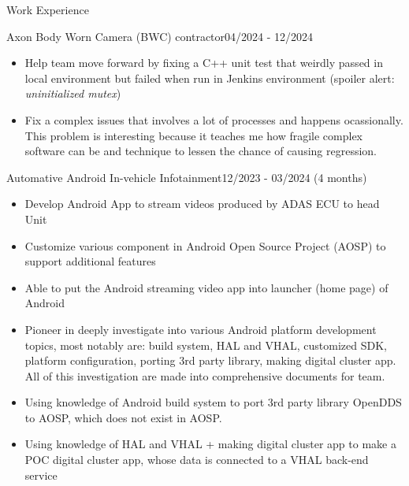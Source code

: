 \documentclass{resume} %
\begin{document}
\begin{rSection}{Work Experience}
\begin{rCompanySubsection}
\begin{rProjectSubsubsectionV2}{Axon Body Worn Camera (BWC) contractor}{04/2024 - 12/2024}
{\begin{itemize}
                \item Help team move forward by fixing a C++ unit test that weirdly passed in local environment but failed when run in Jenkins environment (spoiler alert: \textit{uninitialized mutex})
                \item Fix a complex issues that involves a lot of processes and happens ocassionally. This problem is interesting because it teaches me how fragile complex software can be and technique to lessen the chance of causing regression.
            \end{itemize}
        }
        \end{rProjectSubsubsectionV2}

        \begin{rProjectSubsubsectionV2}{Automative Android In-vehicle Infotainment}{12/2023 - 03/2024 (4 months)}{
            \begin{itemize}
                \item Develop Android App to stream videos produced by ADAS ECU to head Unit
                \item Customize various component in Android Open Source Project (AOSP) to support additional features
            \end{itemize}
        }{
            \begin{itemize}
                \item Able to put the Android streaming video app into launcher (home page) of Android
                \item Pioneer in deeply investigate into various Android platform development topics, most notably are: build system, HAL and VHAL, customized SDK, platform configuration, porting 3rd party library, making digital cluster app. All of this investigation are made into comprehensive documents for team.
                \item Using knowledge of Android build system to port 3rd party library OpenDDS to AOSP, which does not exist in AOSP.
                \item Using knowledge of HAL and VHAL + making digital cluster app to make a POC digital cluster app, whose data is connected to a VHAL back-end service
            \end{itemize}
        }
        \end{rProjectSubsubsectionV2}


\end{rCompanySubsection}
\end{rSection}
\end{document}
